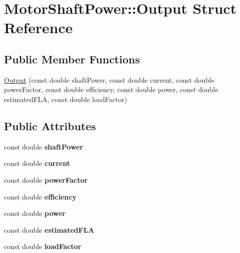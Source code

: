 \hypertarget{struct_motor_shaft_power_1_1_output}{}\section{Motor\+Shaft\+Power\+:\+:Output Struct Reference}
\label{struct_motor_shaft_power_1_1_output}
\subsection*{Public Member Functions}
\begin{DoxyCompactItemize}
\item 
\hyperlink{struct_motor_shaft_power_1_1_output_a64e2082ec024a9a20038dd306533bfa7}{Output} (const double shaft\+Power, const double current, const double power\+Factor, const double efficiency, const double power, const double estimated\+F\+LA, const double load\+Factor)
\end{DoxyCompactItemize}
\subsection*{Public Attributes}
\begin{DoxyCompactItemize}
\item 
\mbox{\label{struct_motor_shaft_power_1_1_output_a9f24851400a9d1f70cc685a0192e35c4}} 
const double {\bfseries shaft\+Power}
\item 
\mbox{\label{struct_motor_shaft_power_1_1_output_a8b1d0a174e3c91bd18ea06b560478c21}} 
const double {\bfseries current}
\item 
\mbox{\label{struct_motor_shaft_power_1_1_output_a603a8e7219d775f20f965bd75a1204f4}} 
const double {\bfseries power\+Factor}
\item 
\mbox{\label{struct_motor_shaft_power_1_1_output_abb253d637322c453d33afa78d16b4b85}} 
const double {\bfseries efficiency}
\item 
\mbox{\label{struct_motor_shaft_power_1_1_output_abaab2f27d778f41e56ff7a7398a4713a}} 
const double {\bfseries power}
\item 
\mbox{\label{struct_motor_shaft_power_1_1_output_a9fc50f9df95d6507017c5a3c306bbc7f}} 
const double {\bfseries estimated\+F\+LA}
\item 
\mbox{\label{struct_motor_shaft_power_1_1_output_a35fe60244887331ad2ae8ede8c5ab995}} 
const double {\bfseries load\+Factor}
\end{DoxyCompactItemize}


